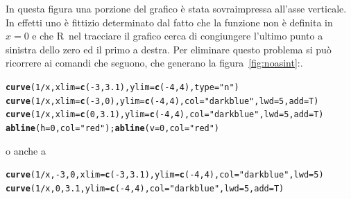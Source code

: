 \documentclass[onecolumn,11pt]{book}\usepackage[]{graphicx}\usepackage[]{color}
\makeatletter
\newcommand{\hlnum}[1]{\textcolor[rgb]{0.686,0.059,0.569}{#1}}%
\newcommand{\hlstr}[1]{\textcolor[rgb]{0.192,0.494,0.8}{#1}}%
\newcommand{\hlopt}[1]{\textcolor[rgb]{0,0,0}{#1}}%
\newcommand{\hlstd}[1]{\textcolor[rgb]{0.345,0.345,0.345}{#1}}%
\newcommand{\hlkwc}[1]{\textcolor[rgb]{0.333,0.667,0.333}{#1}}%
\newcommand{\hlkwd}[1]{\textcolor[rgb]{0.737,0.353,0.396}{\textbf{#1}}}%
\newenvironment{kframe}{%
 \def\at@end@of@kframe{}%
 \ifinner\ifhmode%
  \def\at@end@of@kframe{\end{minipage}}%
  \begin{minipage}{\columnwidth}%
 \fi\fi%
 \def\FrameCommand##1{\hskip\@totalleftmargin \hskip-\fboxsep
 \colorbox{shadecolor}{##1}\hskip-\fboxsep
     \hskip-\linewidth \hskip-\@totalleftmargin \hskip\columnwidth}%
 \MakeFramed {\advance\hsize-\width
   \@totalleftmargin\z@ \linewidth\hsize
   \@setminipage}}%
 {\par\unskip\endMakeFramed%
 \at@end@of@kframe}
\newenvironment{knitrout}{}{} %
\newcommand{\rpr}{\textsf{R}~}
\makeatother
\begin{document}
\begin{itemize}
\begin{itemize}
In questa figura una porzione del grafico \`e stata sovraimpressa all'asse verticale.  In effetti uno \`e fittizio determinato dal fatto che la funzione non \`e definita in $x=0$ e che \rpr nel tracciare il grafico cerca di congiungere l'ultimo punto a sinistra dello zero ed il primo a destra. Per eliminare questo problema si pu\`o ricorrere ai comandi che seguono, che generano la figura~\ref{fig:noasint}:.
\begin{knitrout}
\color{fgcolor}\begin{kframe}
\begin{alltt}
 \hlkwd{curve}\hlstd{(}\hlnum{1}\hlopt{/}\hlstd{x,} \hlkwc{xlim}\hlstd{=}\hlkwd{c}\hlstd{(} \hlopt{-}\hlnum{3}\hlstd{,}\hlnum{3.1}\hlstd{),}\hlkwc{ylim}\hlstd{=}\hlkwd{c}\hlstd{(}\hlopt{-}\hlnum{4}\hlstd{,}\hlnum{4}\hlstd{),}\hlkwc{type}\hlstd{=}\hlstr{"n"}\hlstd{)}
 \hlkwd{curve}\hlstd{(}\hlnum{1}\hlopt{/}\hlstd{x,}\hlkwc{xlim}\hlstd{=}\hlkwd{c}\hlstd{(}\hlopt{-}\hlnum{3}\hlstd{,}\hlnum{0}\hlstd{),} \hlkwc{ylim}\hlstd{=}\hlkwd{c}\hlstd{(}\hlopt{-}\hlnum{4}\hlstd{,}\hlnum{4}\hlstd{),} \hlkwc{col}\hlstd{=}\hlstr{"darkblue"}\hlstd{,}\hlkwc{lwd}\hlstd{=}\hlnum{5}\hlstd{,}\hlkwc{add}\hlstd{=T)}
 \hlkwd{curve}\hlstd{(}\hlnum{1}\hlopt{/}\hlstd{x,}\hlkwc{xlim}\hlstd{=}\hlkwd{c}\hlstd{(}\hlnum{0}\hlstd{,}\hlnum{3.1}\hlstd{),}  \hlkwc{ylim}\hlstd{=}\hlkwd{c}\hlstd{(}\hlopt{-}\hlnum{4}\hlstd{,}\hlnum{4}\hlstd{),}\hlkwc{col}\hlstd{=}\hlstr{"darkblue"}\hlstd{,} \hlkwc{lwd}\hlstd{=}\hlnum{5}\hlstd{,}\hlkwc{add}\hlstd{=T)}
 \hlkwd{abline}\hlstd{(}\hlkwc{h}\hlstd{=}\hlnum{0}\hlstd{,}\hlkwc{col}\hlstd{=}\hlstr{"red"}\hlstd{);} \hlkwd{abline}\hlstd{(}\hlkwc{v}\hlstd{=}\hlnum{0}\hlstd{,}\hlkwc{col}\hlstd{=}\hlstr{"red"}\hlstd{)}
\end{alltt}
\end{kframe}
\end{knitrout}
o anche a
\begin{knitrout}
\color{fgcolor}\begin{kframe}
\begin{alltt}
 \hlkwd{curve}\hlstd{(}\hlnum{1}\hlopt{/}\hlstd{x,} \hlopt{-}\hlnum{3}\hlstd{,}\hlnum{0}\hlstd{,}\hlkwc{xlim}\hlstd{=}\hlkwd{c}\hlstd{(} \hlopt{-}\hlnum{3}\hlstd{,}\hlnum{3.1}\hlstd{),}\hlkwc{ylim}\hlstd{=}\hlkwd{c}\hlstd{(}\hlopt{-}\hlnum{4}\hlstd{,}\hlnum{4}\hlstd{),} \hlkwc{col}\hlstd{=}\hlstr{"darkblue"}\hlstd{,}\hlkwc{lwd}\hlstd{=}\hlnum{5}\hlstd{)}
 \hlkwd{curve}\hlstd{(}\hlnum{1}\hlopt{/}\hlstd{x,}\hlnum{0}\hlstd{,}\hlnum{3.1}\hlstd{,}  \hlkwc{ylim}\hlstd{=}\hlkwd{c}\hlstd{(}\hlopt{-}\hlnum{4}\hlstd{,}\hlnum{4}\hlstd{),}\hlkwc{col}\hlstd{=}\hlstr{"darkblue"}\hlstd{,} \hlkwc{lwd}\hlstd{=}\hlnum{5}\hlstd{,}\hlkwc{add}\hlstd{=T)}

\end{alltt}
\end{kframe}
\end{knitrout}
\end{itemize}
\end{itemize}
\end{document}
